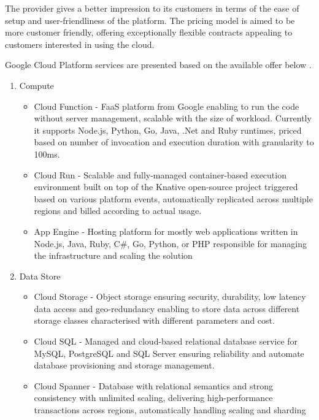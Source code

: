The provider gives a better impression to its customers in terms of the ease of setup and user-friendliness of the platform. The pricing model is aimed to be more customer friendly, offering exceptionally flexible contracts appealing to customers interested in using the cloud.

Google Cloud Platform services are presented based on the available offer below \cite{GCPServerlessOffering}.


\begin{enumerate}
   \item Compute
   \begin{itemize}
       \item Cloud Function - FaaS platform from Google enabling to run the code without server management, scalable with the size of workload. Currently it supports Node.js, Python, Go, Java, .Net and Ruby runtimes, priced based on number of invocation and execution duration with granularity to 100ms.
       \item Cloud Run - Scalable and fully-managed container-based execution environment built on top of the Knative open-source project triggered based on various platform events, automatically replicated across multiple regions and billed according to actual usage.
       \item App Engine - Hosting platform for mostly web applications written in Node.js, Java, Ruby, C\#, Go, Python, or PHP responsible for managing the infrastructure and scaling the solution
   \end{itemize}
   \item Data Store
   \begin{itemize}
       \item Cloud Storage - Object storage ensuring security, durability, low latency data access and geo-redundancy enabling to store data across different storage classes characterised with different parameters and cost.
       \item Cloud SQL - Managed and cloud-based relational database service for MySQL, PostgreSQL and SQL Server ensuring reliability and automate database provisioning and storage management.
       \item Cloud Spanner - Database with relational semantics and strong consistency with unlimited scaling, delivering high-performance transactions across regions, automatically handling scaling and sharding

\end{itemize}
\end{enumerate}
